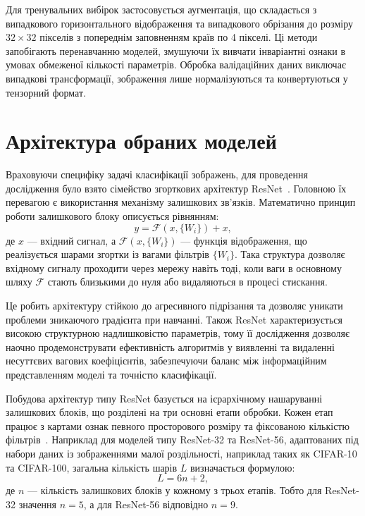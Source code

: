 \documentclass{pma-mthesis}
\begin{document}
Для тренувальних вибірок застосовується аугментація, що складається з випадкового горизонтального відображення та випадкового обрізання до розміру $32 \times 32$ пікселів з попереднім заповненням країв по 4 пікселі. Ці методи запобігають перенавчанню моделей, змушуючи їх вивчати інваріантні ознаки в умовах обмеженої кількості параметрів. Обробка валідаційних даних виключає випадкові трансформації, зображення лише нормалізуються та конвертуються у тензорний формат.

\section{Архітектура обраних моделей}

Враховуючи специфіку задачі класифікації зображень, для проведення дослідження було взято сімейство згорткових архітектур ResNet~\cite{he2016deep}. Головною їх перевагою є використання механізму залишкових зв’язків. Математично принцип роботи залишкового блоку описується рівнянням:
\begin{equation}
    y = \mathcal{F}(x, \{W_i\}) + x,
\end{equation}
де $x$ --- вхідний сигнал, а $\mathcal{F}(x, \{W_i\})$ --- функція відображення, що реалізується шарами згортки із вагами фільтрів $\{W_i\}$. Така структура дозволяє вхідному сигналу проходити через мережу навіть тоді, коли ваги в основному шляху $\mathcal{F}$ стають близькими до нуля або видаляються в процесі стискання. 

Це робить архітектуру стійкою до агресивного підрізання та дозволяє уникати проблеми зникаючого градієнта при навчанні. Також ResNet характеризується високою структурною надлишковістю параметрів, тому її дослідження дозволяє наочно продемонструвати ефективність алгоритмів у виявленні та видаленні несуттєвих вагових коефіцієнтів, забезпечуючи баланс між інформаційним представленням моделі та точністю класифікації.

Побудова архітектур типу ResNet базується на ієрархічному нашаруванні залишкових блоків, що розділені на три основні етапи обробки. Кожен етап працює з картами ознак певного просторового розміру та фіксованою кількістю фільтрів~\cite{he2016deep}. Наприклад для моделей типу ResNet-32 та ResNet-56, адаптованих під набори даних із зображеннями малої роздільності, наприклад таких як CIFAR-10 та CIFAR-100, загальна кількість шарів $L$ визначається формулою:  
\begin{equation}
    L = 6n + 2,
\end{equation}
де $n$ --- кількість залишкових блоків у кожному з трьох етапів. Тобто для ResNet-32 значення $n=5$, а для ResNet-56 відповідно $n=9$.
\end{document}
